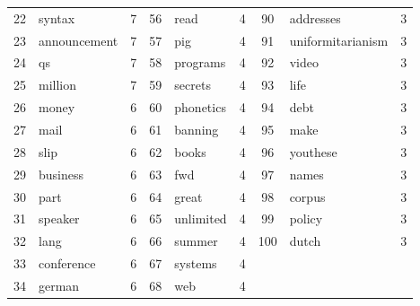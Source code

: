 \documentclass[10pt, a4paper]{article}
\begin{document}
\begin{table}[h!]
\begin{tabular}{|c|l|c||c|l|c||c|l|c|}
22 & syntax & 7 & 56 & read & 4 & 90 & addresses & 3 \\
23 & announcement & 7 & 57 & pig & 4 & 91 & uniformitarianism & 3 \\
24 & qs & 7 & 58 & programs & 4 & 92 & video & 3 \\
25 & million & 7 & 59 & secrets & 4 & 93 & life & 3 \\
26 & money & 6 & 60 & phonetics & 4 & 94 & debt & 3 \\
27 & mail & 6 & 61 & banning & 4 & 95 & make & 3 \\
28 & slip & 6 & 62 & books & 4 & 96 & youthese & 3 \\
29 & business & 6 & 63 & fwd & 4 & 97 & names & 3 \\
30 & part & 6 & 64 & great & 4 & 98 & corpus & 3 \\
31 & speaker & 6 & 65 & unlimited & 4 & 99 & policy & 3 \\
32 & lang & 6 & 66 & summer & 4 & 100 & dutch & 3 \\
33 & conference & 6 & 67 & systems & 4 &  &  &  \\
34 & german & 6 & 68 & web & 4 &  &  &  \\
\hline
\end{tabular}
\label{table:subjcorpus}
\end{table}
\end{document}
